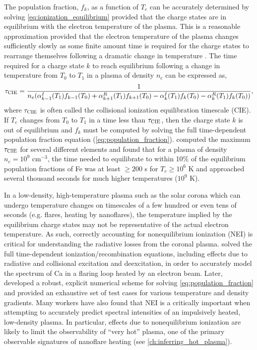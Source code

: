 The population fraction, $f_k$, as a function of $T_e$ can be accurately determined by solving \autoref{eq:ionization_equilibrium} provided that the charge states are in equilibrium with the electron temperature of the plasma. This is a reasonable approximation provided that the electron temperature of the plasma changes sufficiently slowly as some finite amount time is required for the charge states to rearrange themselves following a dramatic change in temperature \citep{bradshaw_collisional_2013}. The time required for a charge state $k$ to reach equilibrium following a change in temperature from $T_0$ to $T_1$ in a plasma of density $n_e$ can be expressed as,
\begin{equation}\label{eq:cie_timescale}
    \tau_\textup{CIE} = \frac{1}{n_e(\alpha_{k-1}^I(T_1) f_{k-1}(T_0) + \alpha_{k+1}^R(T_1) f_{k+1}(T_0) - \alpha_{k}^I(T_1) f_k(T_0) - \alpha_k^R(T_1) f_k(T_0))},
\end{equation}
where $\tau_\textup{CIE}$ is often called the collisional ionization equilibration timescale (CIE). If $T_e$ changes from $T_0$ to $T_1$ in a time less than $\tau_\textup{CIE}$, then the charge state $k$ is out of equilibrium and $f_k$ must be computed by solving the full time-dependent population fraction equation (\autoref{eq:population_fraction}). \citet{smith_ionization_2010} computed the maximum $\tau_\textup{CIE}$ for several different elements and found that for a plasma of density $n_e=10^9$ cm$^{-3}$, the time needed to equilibrate to within 10\% of the equilibrium population fractions of Fe was at least $\ge200$ s for $T_e\ge10^6$ K and approached several thousand seconds for much higher temperatures ($10^9$ K).

In a low-density, high-temperature plasma such as the solar corona which can undergo temperature changes on timescales of a few hundred or even tens of seconds (e.g. flares, heating by nanoflares), the temperature implied by the equilibrium charge states may not be representative of the actual electron temperature. As such, correctly accounting for nonequilibrium ionization (NEI) is critical for understanding the radiative losses from the coronal plasma. \citet{macneice_numerical_1984} solved the full time-dependent ionization/recombination equations, including effects due to radiative and collisional excitation and deexcitation, in order to accurately model the spectrum of Ca in a flaring loop heated by an electron beam. Later, \citet{bradshaw_numerical_2009} developed a robust, explicit numerical scheme for solving \autoref{eq:population_fraction} and provided an exhaustive set of test cases for various temperature and density gradients. Many workers \citep[e.g.][]{hansteen_new_1993,reale_nonequilibrium_2008,bradshaw_radiative_2003,bradshaw_explosive_2006,bradshaw_what_2011,bradshaw_quantifying_2019} have also found that NEI is a critically important when attempting to accurately predict spectral intensities of an impulsively heated, low-density plasma. In particular, effects due to nonequilibrium ionization are likely to limit the observability of ``very hot'' plasma, one of the primary observable signatures of nanoflare heating (see \autoref{ch:inferring_hot_plasma}).


